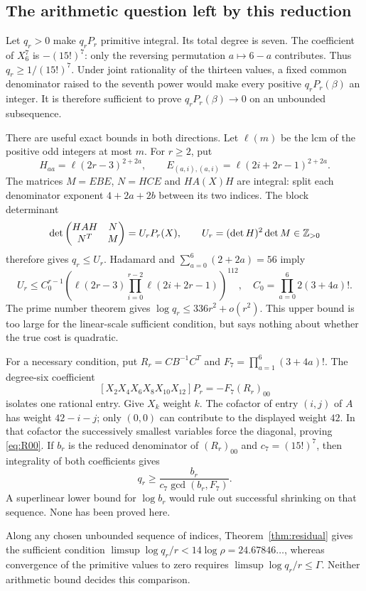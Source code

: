 \subsection{The arithmetic question left by this reduction}
Let $q_r>0$ make $q_rP_r$ primitive integral. Its total degree is seven.
The coefficient of $X_6^7$ is $-(15!)^7$: only the reversing permutation
$a\mapsto6-a$ contributes. Thus $q_r\geq1/(15!)^7$.
Under joint rationality of the thirteen values, a fixed common
denominator raised to the seventh power would make every positive
$q_rP_r(\beta)$ an integer. It is therefore sufficient to prove
$q_rP_r(\beta)\to0$ on an unbounded subsequence.

There are useful exact bounds in both directions. Let $\ell(m)$ be
the lcm of the positive odd integers at most $m$. For $r\geq2$, put
\[
 H_{aa}=\ell(2r-3)^{2+2a},\qquad
 E_{(a,i),(a,i)}=\ell(2i+2r-1)^{2+2a}.
\]
The matrices $M=EBE$, $N=HCE$ and $HA(X)H$ are integral: split each
denominator exponent $4+2a+2b$ between its two indices. The block
determinant
\[
 \det\begin{pmatrix}HAH&N\\N^T&M\end{pmatrix}
       =U_rP_r(X),\qquad U_r=(\det H)^2\det M\in\mathbb Z_{>0}
\]
therefore gives $q_r\leq U_r$. Hadamard and
$\sum_{a=0}^6(2+2a)=56$ imply
\[
 U_r\leq C_0^{r-1}
 \left(\ell(2r-3)\prod_{i=0}^{r-2}\ell(2i+2r-1)\right)^{112},
 \quad C_0=\prod_{a=0}^6 2(3+4a)!.
\]
The prime number theorem gives $\log q_r\leq336r^2+o(r^2)$.
This upper bound is too large for the linear-scale sufficient condition,
but says nothing about whether the true cost is quadratic.

For a necessary condition, put $R_r=CB^{-1}C^T$ and
$F_7=\prod_{a=1}^6(3+4a)!$. The degree-six coefficient
\begin{equation}\label{eq:R00}
 [X_2X_4X_6X_8X_{10}X_{12}]P_r=-F_7(R_r)_{00}
\end{equation}
isolates one rational entry. Give $X_k$ weight $k$. The cofactor of
entry $(i,j)$ of $A$ has weight $42-i-j$; only $(0,0)$ can contribute
to the displayed weight $42$. In that cofactor the successively
smallest variables force the diagonal, proving \eqref{eq:R00}.
If $b_r$ is the reduced denominator of $(R_r)_{00}$ and
$c_7=(15!)^7$, then integrality of both coefficients gives
\[
 q_r\geq\frac{b_r}{c_7\gcd(b_r,F_7)}.
\]
A superlinear lower bound for $\log b_r$ would rule out successful
shrinking on that sequence. None has been proved here.

Along any chosen unbounded sequence of indices,
Theorem~\ref{thm:residual} gives the sufficient condition
$\limsup\log q_r/r<14\log\rho=24.67846\ldots$, whereas convergence
of the primitive values to zero requires
$\limsup\log q_r/r\leq\Gamma$. Neither arithmetic bound decides
this comparison.

